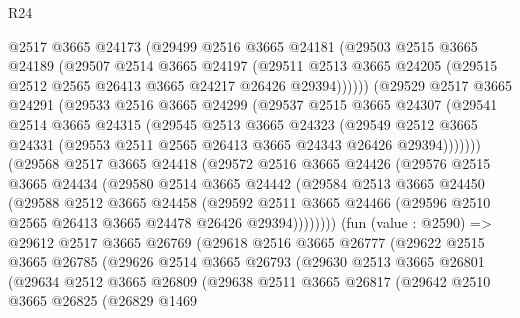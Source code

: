 \begin{lexlean}{R24}
\begin{coremodule}
          @2517
          @3665
          @24173
          (@29499
            @2516
            @3665
            @24181
            (@29503
              @2515
              @3665
              @24189
              (@29507
                @2514
                @3665
                @24197
                (@29511
                  @2513
                  @3665
                  @24205
                  (@29515 @2512 @2565 @26413 @3665 @24217 @26426 @29394))))))
        (@29529
          @2517
          @3665
          @24291
          (@29533
            @2516
            @3665
            @24299
            (@29537
              @2515
              @3665
              @24307
              (@29541
                @2514
                @3665
                @24315
                (@29545
                  @2513
                  @3665
                  @24323
                  (@29549
                    @2512
                    @3665
                    @24331
                    (@29553 @2511 @2565 @26413 @3665 @24343 @26426 @29394)))))))
        (@29568
          @2517
          @3665
          @24418
          (@29572
            @2516
            @3665
            @24426
            (@29576
              @2515
              @3665
              @24434
              (@29580
                @2514
                @3665
                @24442
                (@29584
                  @2513
                  @3665
                  @24450
                  (@29588
                    @2512
                    @3665
                    @24458
                    (@29592
                      @2511
                      @3665
                      @24466
                      (@29596 @2510 @2565 @26413 @3665 @24478 @26426 @29394))))))))
        (fun (value : @2590) =>
        @29612
          @2517
          @3665
          @26769
          (@29618
            @2516
            @3665
            @26777
            (@29622
              @2515
              @3665
              @26785
              (@29626
                @2514
                @3665
                @26793
                (@29630
                  @2513
                  @3665
                  @26801
                  (@29634
                    @2512
                    @3665
                    @26809
                    (@29638
                      @2511
                      @3665
                      @26817
                      (@29642
                        @2510
                        @3665
                        @26825
                        (@26829
                          @1469

\end{coremodule}
\end{lexlean}

